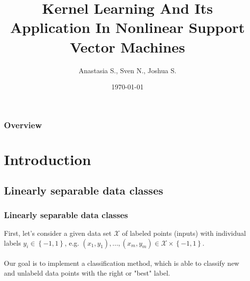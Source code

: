 \documentclass{beamer}
\title[Kernel Learning]{Kernel Learning And Its Application In Nonlinear Support Vector Machines} %
\author{Anastasia S., Sven N., Joshua S.} %
\institute[] %
{
Otto-Friedrich-University Bamberg \\ %
\medskip
\textit{anastasia.sinitsyna@stud.uni-bamberg.de \\}
\textit{sven-jason-waldemar.nekula@stud.uni-bamberg.de \\} %
\textit{joshua-guenter.simon@stud.uni-bamberg.de} %
}
\date{\today} %
\begin{document}
\begin{frame}
\titlepage %
\end{frame}

\begin{frame}
\frametitle{Overview} %
\tableofcontents %
\end{frame}


\section{Introduction} 


\subsection{Linearly separable data classes}

\begin{frame}{}
    \frametitle{Linearly separable data classes}
    First, let's consider a given data set $\mathcal{X}$ of labeled points (inputs) with individual labels $y_i \in \left\{ -1,1 \right\}$, e.g. $(x_1,y_1), ..., (x_m, y_m) \in \mathcal{X} \times \left\{ -1,1 \right\}$. \\~\\
    
    Our goal is to implement a classification method, which is able to classify new and unlabeld data points with the right or "best" label. \\~\\
\end{frame}
\end{document}

